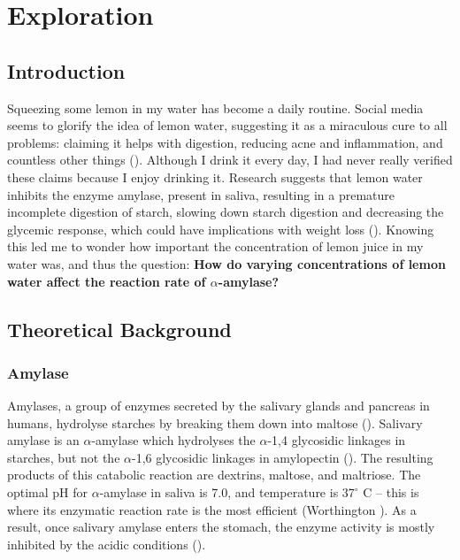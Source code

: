 \documentclass[12pt]{article}
\begin{document}
\section{Exploration}

\subsection{Introduction}

Squeezing some lemon in my water has become a daily routine. Social media seems to glorify the idea of lemon water, suggesting it as a miraculous cure to all problems: claiming it helps with digestion, reducing acne and inflammation, and countless other things (\cite{mcdermott_2022}). Although I drink it every day, I had never really verified these claims because I enjoy drinking it. Research suggests that lemon water inhibits the enzyme amylase, present in saliva, resulting in a premature incomplete digestion of starch, slowing down starch digestion and decreasing the glycemic response, which could have implications with weight loss (\citeauthor{freitas_le_feunteun_2019}). Knowing this led me to wonder how important the concentration of lemon juice in my water was, and thus the question: \textbf{How do varying concentrations of lemon water affect the reaction rate of $\alpha$-amylase?}

\subsection{Theoretical Background}

\subsubsection{Amylase}

Amylases, a group of enzymes secreted by the salivary glands and pancreas in humans, hydrolyse starches by breaking them down into maltose (\citeauthor{taniguchi_honnda_2009}). Salivary amylase is an $\alpha$-amylase which hydrolyses the $\alpha$-1,4 glycosidic linkages in starches, but not the $\alpha$-1,6 glycosidic linkages in amylopectin (\citeauthor{lowe_2004}). The resulting products of this catabolic reaction are dextrins, maltose, and maltriose. The optimal pH for $\alpha$-amylase in saliva is 7.0, and temperature is $37^\circ$ C -- this is where its enzymatic reaction rate is the most efficient (Worthington \citeauthor{worthington_biochemical}). As a result, once salivary amylase enters the stomach, the enzyme activity is mostly inhibited by the acidic conditions (\citeauthor{peyrot_des_gachons_breslin_2016}). 
\end{document}
